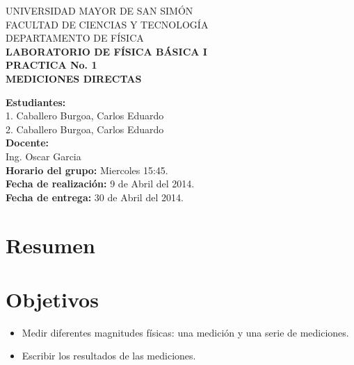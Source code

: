 \documentclass[letter,twoside,11pt]{article}
\newcommand{\blankpage}{
\newpage
\thispagestyle{empty}
\mbox{}
\newpage
}
\begin{document}
\begin{titlepage}
\begin{center}
{\Large UNIVERSIDAD MAYOR DE SAN SIMÓN}\\
\vspace*{0.15cm}
{\large FACULTAD DE CIENCIAS Y TECNOLOGÍA}\\
\vspace*{0.10cm}
DEPARTAMENTO DE FÍSICA\\
\vspace*{3.0cm}
{\Large \textbf{LABORATORIO DE FÍSICA BÁSICA I}}\\
\vspace*{0.3cm}
{\Large \textbf{PRACTICA No. 1}}\\
\vspace*{3.5cm}
{\Large \textbf{MEDICIONES DIRECTAS}}\\
\end{center}

\vspace*{6.0cm}
\leftskip=7.95cm
\noindent
\textbf{Estudiantes:}\\
1. Caballero Burgoa, Carlos Eduardo\\
2. Caballero Burgoa, Carlos Eduardo\\
\newline
\textbf{Docente:}\\
Ing. Oscar Garcia\\
\newline
\textbf{Horario del grupo:} Miercoles 15:45.\\
\textbf{Fecha de realización:} 9 de Abril del 2014.\\
\textbf{Fecha de entrega:} 30 de Abril del 2014.\\

\end{titlepage}

\blankpage

\section{Resumen}
\section{Objetivos}
\begin{itemize}
\item Medir diferentes magnitudes físicas: una medición y una serie de
mediciones.
\item Escribir los resultados de las mediciones.
\end{itemize}
\end{document}
